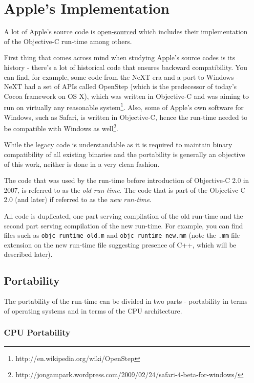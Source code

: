 \chapter{Apple's Implementation}

A lot of Apple's source code is \href{''http://www.opensource.apple.com''}{open-sourced} which includes their implementation of the Objective-C run-time among others.

First thing that comes across mind when studying Apple's source codes is its history - there's a lot of historical code that ensures backward compatibility. You can find, for example, some code from the NeXT era and a port to Windows - NeXT had a set of APIs called OpenStep (which is the predecessor of today's Cocoa framework on OS X), which was written in Objective-C and was aiming to run on virtually any reasonable system\footnote{http://en.wikipedia.org/wiki/OpenStep}. Also, some of Apple's own software for Windows, such as Safari, is written in Objective-C, hence the run-time needed to be compatible with Windows as well\footnote{http://jongampark.wordpress.com/2009/02/24/safari-4-beta-for-windows/}.

While the legacy code is understandable as it is required to maintain binary compatibility of all existing binaries and the portability is generally an objective of this work, neither is done in a very clean fashion.

The code that was used by the run-time before introduction of Objective-C 2.0 in 2007, is referred to as the \emph{old run-time}. The code that is part of the Objective-C 2.0 (and later) if referred to as the \emph{new run-time}.

All code is duplicated, one part serving compilation of the old run-time and the second part serving compilation of the new run-time. For example, you can find files such as \verb=objc-runtime-old.m= and \verb=objc-runtime-new.mm= (note the \verb=.mm= file extension on the new run-time file suggesting presence of C++, which will be described later).

\section{Portability}

The portability of the run-time can be divided in two parts - portability in terms of operating systems and in terms of the CPU architecture.

\subsection{CPU Portability}

